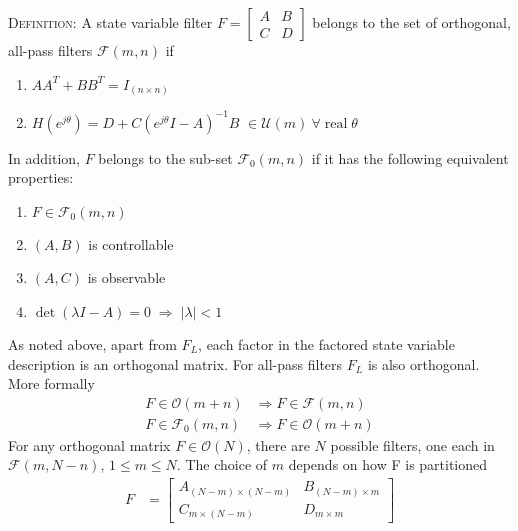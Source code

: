 \documentclass[a4paper,twoside,10pt,english]{report}
\begin{document}
\textsc{Definition:}
A state variable filter $F=\left[\begin{array}{cc}
A & B\\
C & D
\end{array}\right]$ belongs to the set of orthogonal, all-pass filters 
$\mathcal{F}\left(m,n\right)$ if 
\begin{enumerate}
\item $AA^{T}+BB^{T}=I_{(n\times{}n)}$
\item $H\left(e^{j\theta}\right)=D+C\left(e^{j\theta}I-A\right)^{-1}B\,\,\in\mathcal{U}\left(m\right)~\forall{} \;\text{real} \; \theta$
\end{enumerate}
In addition, $F$ belongs to the sub-set $\mathcal{F}_{0}\left(m,n\right)$
if it has the following equivalent properties:
\begin{enumerate}
\item $F\in\mathcal{F}_{0}\left(m,n\right)$
\item $\left(A,B\right)$ is controllable
\item $\left(A,C\right)$ is observable
\item $\det\left(\lambda{}I-A\right)=0\;\Rightarrow\;\left|\lambda\right|<1$
\end{enumerate}
As noted above, apart from $F_{L}$, each factor in the factored state
variable description is an orthogonal matrix. For all-pass filters
$F_{L}$ is also orthogonal. More formally
\begin{align*}
F\in\mathcal{O}\left(m+n\right) & \Rightarrow  F\in\mathcal{F}\left(m,n\right)\\
F\in\mathcal{F}_{0}\left(m,n\right) & \Rightarrow  F\in\mathcal{O}\left(m+n\right)
\end{align*}
 For any orthogonal matrix $F\in\mathcal{O}\left(N\right)$, there
are $N$ possible filters, one each in $\mathcal{F}\left(m,N-n\right)$,
$1\leq m\leq N$. The choice of $m$ depends on how F is partitioned
\begin{align*}
F &=  \left[\begin{array}{ll}
A_{(N-m)\times(N-m)} & B_{(N-m)\times m}\\
C_{m\times(N-m)} & D_{m\times m}
\end{array}\right]
\end{align*}
\end{document}
